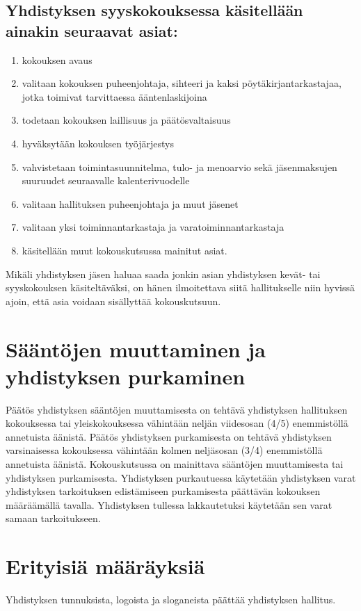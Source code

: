 \documentclass[a4paper, 12pt, finnish]{scrartcl}
\begin{document}
\subsection*{Yhdistyksen syyskokouksessa käsitellään ainakin seuraavat asiat:}
\begin{enumerate}
  \item kokouksen avaus
  \item valitaan kokouksen puheenjohtaja, sihteeri ja kaksi pöytäkirjantarkastajaa, jotka toimivat tarvittaessa ääntenlaskijoina
  \item todetaan kokouksen laillisuus ja päätösvaltaisuus
  \item hyväksytään kokouksen työjärjestys
  \item vahvistetaan toimintasuunnitelma, tulo- ja menoarvio sekä jäsenmaksujen suuruudet seuraavalle kalenterivuodelle
  \item valitaan hallituksen puheenjohtaja ja muut jäsenet
  \item valitaan yksi toiminnantarkastaja ja varatoiminnantarkastaja
  \item käsitellään muut kokouskutsussa mainitut asiat.
\end{enumerate}

Mikäli yhdistyksen jäsen haluaa saada jonkin asian yhdistyksen kevät- tai syyskokouksen käsiteltäväksi, on hänen ilmoitettava siitä hallitukselle niin hyvissä ajoin, että asia voidaan sisällyttää kokouskutsuun.

\section{Sääntöjen muuttaminen ja yhdistyksen purkaminen}
Päätös yhdistyksen sääntöjen muuttamisesta on tehtävä yhdistyksen hallituksen kokouksessa tai yleiskokouksessa vähintään neljän viidesosan (4/5) enemmistöllä annetuista äänistä.
Päätös yhdistyksen purkamisesta on tehtävä yhdistyksen varsinaisessa kokouksessa vähintään kolmen neljäsosan (3/4) enemmistöllä annetuista äänistä.
Kokouskutsussa on mainittava sääntöjen muuttamisesta tai yhdistyksen purkamisesta.
Yhdistyksen purkautuessa käytetään yhdistyksen varat yhdistyksen tarkoituksen edistämiseen purkamisesta päättävän kokouksen määräämällä tavalla.
Yhdistyksen tullessa lakkautetuksi käytetään sen varat samaan tarkoitukseen.

\section{Erityisiä määräyksiä}
Yhdistyksen tunnuksista, logoista ja sloganeista päättää yhdistyksen hallitus.
\end{document}
